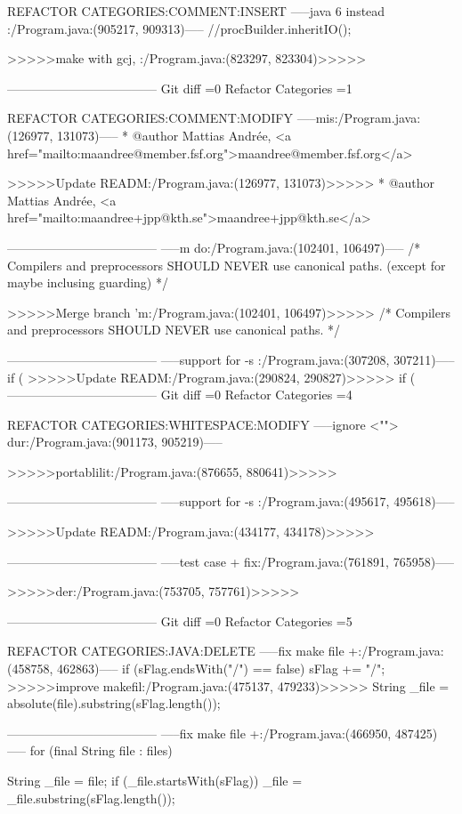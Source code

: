 {{{{{{{{{{REFACTOR CATEGORIES:COMMENT:INSERT
-----java 6 instead :/Program.java:(905217, 909313)-----
        //procBuilder.inheritIO();
 
>>>>>make with gcj, :/Program.java:(823297, 823304)>>>>>
        
------------------------------------
Git diff =0  Refactor Categories =1

REFACTOR CATEGORIES:COMMENT:MODIFY
-----mis:/Program.java:(126977, 131073)-----
 * @author  Mattias Andrée, <a href="mailto:maandree@member.fsf.org">maandree@member.fsf.org</a>
 
>>>>>Update READM:/Program.java:(126977, 131073)>>>>>
 * @author  Mattias Andrée, <a href="mailto:maandree+jpp@kth.se">maandree+jpp@kth.se</a>
 
------------------------------------
-----m do:/Program.java:(102401, 106497)-----
/* Compilers and preprocessors SHOULD NEVER use canonical paths. (except for maybe inclusing guarding) */


>>>>>Merge branch 'm:/Program.java:(102401, 106497)>>>>>
/* Compilers and preprocessors SHOULD NEVER use canonical paths. */


------------------------------------
-----support for -s :/Program.java:(307208, 307211)-----
if (
>>>>>Update READM:/Program.java:(290824, 290827)>>>>>
if (
------------------------------------
Git diff =0  Refactor Categories =4

REFACTOR CATEGORIES:WHITESPACE:MODIFY
-----ignore <""> dur:/Program.java:(901173, 905219)-----

			
>>>>>portablilit:/Program.java:(876655, 880641)>>>>>

	
------------------------------------
-----support for -s :/Program.java:(495617, 495618)-----
		
>>>>>Update READM:/Program.java:(434177, 434178)>>>>>
		
------------------------------------
-----test case + fix:/Program.java:(761891, 765958)-----

		    
>>>>>der:/Program.java:(753705, 757761)>>>>>

	
------------------------------------
Git diff =0  Refactor Categories =5

REFACTOR CATEGORIES:JAVA:DELETE
-----fix make file +:/Program.java:(458758, 462863)-----
if (sFlag.endsWith("/") == false)
		sFlag += "/";
>>>>>improve makefil:/Program.java:(475137, 479233)>>>>>
		String _file = absolute(file).substring(sFlag.length());
	
------------------------------------
-----fix make file +:/Program.java:(466950, 487425)-----
for (final String file : files)
	    {
		String _file = file;
		if (_file.startsWith(sFlag))
		    _file = _file.substring(sFlag.length());
	
}}}}}}}}}}}
